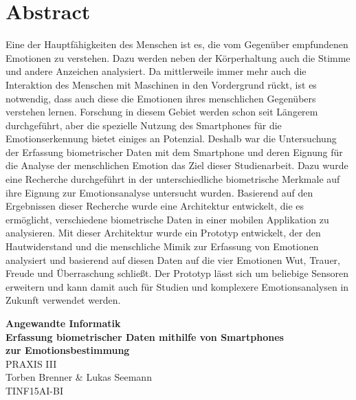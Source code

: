 \documentclass[12pt,titlepage,ngerman]{article}
\begin{document}
\section*{Abstract}
Eine der Hauptfähigkeiten des Menschen ist es, die vom Gegenüber empfundenen Emotionen zu verstehen. Dazu werden neben der Körperhaltung auch die Stimme und andere Anzeichen analysiert. Da mittlerweile immer mehr auch die Interaktion des Menschen mit Maschinen in den Vordergrund rückt, ist es notwendig, dass auch diese die Emotionen ihres menschlichen Gegenübers verstehen lernen. Forschung in diesem Gebiet werden schon seit Längerem durchgeführt, aber die spezielle Nutzung des Smartphones für die Emotionserkennung bietet einiges an Potenzial.\newline \newline
Deshalb war die Untersuchung der Erfassung biometrischer Daten mit dem Smartphone und deren Eignung für die Analyse der menschlichen Emotion das Ziel dieser Studienarbeit. Dazu wurde eine Recherche durchgeführt in der unterschiedliche biometrische Merkmale auf ihre Eignung zur Emotionsanalyse untersucht wurden. Basierend auf den Ergebnissen dieser Recherche wurde eine Architektur entwickelt, die es ermöglicht, verschiedene biometrische Daten in einer mobilen Applikation zu analysieren. Mit dieser Architektur wurde ein Prototyp entwickelt, der den Hautwiderstand und die menschliche Mimik zur Erfassung von Emotionen analysiert und basierend auf diesen Daten auf die vier Emotionen Wut, Trauer, Freude und Überraschung schließt. Der Prototyp lässt sich um beliebige Sensoren erweitern und kann damit auch für Studien und komplexere Emotionsanalysen in Zukunft verwendet werden.
\newpage
{}
\begin{flushright}
	\vspace{1cm}
	{\bfseries Angewandte Informatik} \\
	\vspace{\baselineskip}
	{\bfseries Erfassung biometrischer Daten mithilfe von Smartphones} \\
	{\bfseries zur Emotionsbestimmung} \\
	\vspace{0.5cm}
	PRAXIS III \\
	Torben Brenner \& Lukas Seemann \\
	TINF15AI-BI
\end{flushright}
\end{document}
